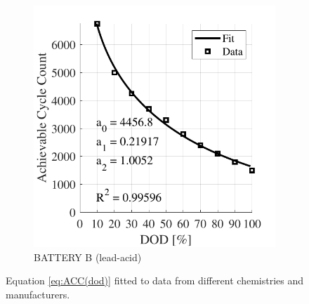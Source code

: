 \documentclass{ieeeaccess}
\begin{document}
\begin{figure}[!h]
\begin{subfigure}{.235\textwidth}
			\includegraphics[width=\linewidth]{figures/acc_fitting_Rolls_16CH35P_lead-acid.pdf}
			\caption{BATTERY B (lead-acid)}
			\label{fig:accNimh2}
		\end{subfigure}
		\caption{Equation \eqref{eq:ACC(dod)} fitted to data from different chemistries and manufacturers.}
		\label{fig:acc(dod)2}
	\end{figure}
\end{document}

